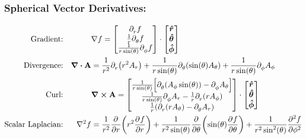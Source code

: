     \subsubsection*{Spherical Vector Derivatives:}
        {\setlength\jot{1cm}
        \renewcommand{\arraystretch}{1.5}
        \begin{align*}
            \text{Gradient:}&&
            &\nabla f = 
            \qty[
            \begin{matrix}
                \pder*{f}{r}
                \\
                \frac{1}{r} \pder*{f}{\theta}
                \\
                \frac{1}{r \sin(\theta)}\pder*{f}{\phi}
            \end{matrix}
            ]\cdot\qty[
            \begin{matrix}
                \e{r}\\\e{\theta}\\\e{\phi}
            \end{matrix}
            ]
            \\
            \text{Divergence:}&&
            \div \vb{A} &= \oo{r^2}\pder*{r}\qty(r^2A_r) 
            + \oo{r \sin(\theta)} \pder*{\theta} \qty(\sin(\theta)A_\theta) 
            + \oo{r \sin(\theta)} \pder*{A_\phi}{\phi}
            \\
            \text{Curl:}&&
            &\curl \vb{A} = 
            \qty[
               \begin{matrix}
                    \oo{r\sin(\theta)}\qty[\pder*{\theta}\qty(A_\phi\sin(\theta))-\pder*{A_\theta}{\phi}]
                    \\
                    \oo{r\sin(\theta)}\pder*{A_r}{\phi}-\oo{r}\pder*{r}\qty(r A_{\phi})
                    \\
                    \frac{1}{r}\qty(\pder*{r}\qty(rA_{\theta}) - \pder*{\theta}A_r)
                \end{matrix}
            ]\cdot\qty[
            \begin{matrix}
                \e{r} \\\e{\theta} \\\e{\phi}
            \end{matrix}]
            \\
            \text{Scalar Laplacian:}&&
            \nabla^2 f 
            &= \frac{1}{r^2} \pder{r}\qty(r^2 \pder{f}{r}) + \oo{r^2 \sin(\theta)} \pder{\theta} \qty(\sin(\theta)\pder{f}{\theta}) +\frac{1}{r^2 \sin^2(\theta)} \pder[2]{f}{\phi}
        \end{align*}}


